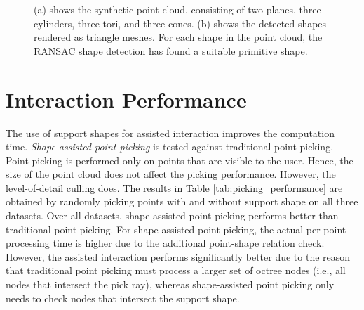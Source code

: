 \begin{figure}[p]
\centering
{}
\caption[Rendering of the synthetic point cloud in (a), rendering of the detected shapes in (b)]
{(a) shows the synthetic point cloud, consisting of two planes, three cylinders, three tori, and three cones. (b) shows the detected shapes rendered as triangle meshes. For each shape in the point cloud, the RANSAC shape detection has found a suitable primitive shape. }
\label{fig:synthetic_point_cloud_results}
\end{figure}


\section{Interaction Performance}
\label{sec:interaction_performance}

The use of support shapes for assisted interaction improves the computation time. \textit{Shape-assisted point picking} is tested against traditional point picking. Point picking is performed only on points that are visible to the user. Hence, the size of the point cloud does not affect the picking performance. However, the level-of-detail culling does. The results in Table \ref{tab:picking_performance} are obtained by randomly picking points with and without support shape on all three datasets. Over all datasets, shape-assisted point picking performs better than traditional point picking. For shape-assisted point picking, the actual per-point processing time is higher due to the additional point-shape relation check. However, the assisted interaction performs significantly better due to the reason that traditional point picking must process a larger set of octree nodes (i.e., all nodes that intersect the pick ray), whereas shape-assisted point picking only needs to check nodes that intersect the support shape. 

